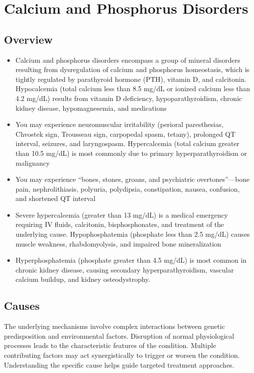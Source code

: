 \chapter{Calcium and Phosphorus Disorders}
\label{sec:Calcium and Phosphorus Disorders}

\section{Overview}


\begin{itemize}[noitemsep]
  \item Calcium and phosphorus disorders encompass a group of mineral disorders resulting from dysregulation of calcium and phosphorus homeostasis, which is tightly regulated by parathyroid hormone (PTH), vitamin D, and calcitonin. Hypocalcemia (total calcium less than 8.5 mg/dL or ionized calcium less than 4.2 mg/dL) results from vitamin D deficiency, hypoparathyroidism, chronic kidney disease, hypomagnesemia, and medications
  \item You may experience neuromuscular irritability (perioral paresthesias, Chvostek sign, Trousseau sign, carpopedal spasm, tetany), prolonged QT interval, seizures, and laryngospasm. Hypercalcemia (total calcium greater than 10.5 mg/dL) is most commonly due to primary hyperparathyroidism or malignancy
  \item You may experience ``bones, stones, groans, and psychiatric overtones''---bone pain, nephrolithiasis, polyuria, polydipsia, constipation, nausea, confusion, and shortened QT interval
  \item Severe hypercalcemia (greater than 13 mg/dL) is a medical emergency requiring IV fluids, calcitonin, bisphosphonates, and treatment of the underlying cause. Hypophosphatemia (phosphate less than 2.5 mg/dL) causes muscle weakness, rhabdomyolysis, and impaired bone mineralization
  \item Hyperphosphatemia (phosphate greater than 4.5 mg/dL) is most common in chronic kidney disease, causing secondary hyperparathyroidism, vascular calcium buildup, and kidney osteodystrophy.
\end{itemize}
\section{Causes}
The underlying mechanisms involve complex interactions between genetic predisposition and environmental factors. Disruption of normal physiological processes leads to the characteristic features of the condition. Multiple contributing factors may act synergistically to trigger or worsen the condition. Understanding the specific cause helps guide targeted treatment approaches.
